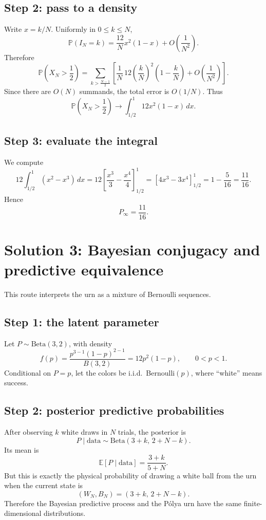 \documentclass[12pt]{article}
\begin{document}
\subsection*{Step 2: pass to a density}
Write $x=k/N$. Uniformly in $0\le k\le N$,
\[
\mathbb{P}(I_N=k)
=
\frac{12}{N}x^2(1-x)+O\!\left(\frac{1}{N^2}\right).
\]
Therefore
\[
\mathbb{P}\!\left(X_N>\frac12\right)
=
\sum_{k>\frac{N-1}{2}}
\left[
\frac{1}{N}\,12\left(\frac{k}{N}\right)^2\left(1-\frac{k}{N}\right)
+O\!\left(\frac{1}{N^2}\right)
\right].
\]
Since there are $O(N)$ summands, the total error is $O(1/N)$. Thus
\[
\mathbb{P}\!\left(X_N>\frac12\right)
\longrightarrow
\int_{1/2}^{1} 12x^2(1-x)\,dx.
\]

\subsection*{Step 3: evaluate the integral}
We compute
\[
12\int_{1/2}^{1}(x^2-x^3)\,dx
=
12\left[\frac{x^3}{3}-\frac{x^4}{4}\right]_{1/2}^{1}
=
\left[4x^3-3x^4\right]_{1/2}^{1}
=
1-\frac{5}{16}
=
\frac{11}{16}.
\]
Hence
\[
P_\infty=\frac{11}{16}.
\]

\section{Solution 3: Bayesian conjugacy and predictive equivalence}

This route interprets the urn as a mixture of Bernoulli sequences.

\subsection*{Step 1: the latent parameter}
Let $P\sim \mathrm{Beta}(3,2)$, with density
\[
f(p)=\frac{p^{3-1}(1-p)^{2-1}}{B(3,2)}=12p^2(1-p), \qquad 0<p<1.
\]
Conditional on $P=p$, let the colors be i.i.d.\ Bernoulli$(p)$, where ``white'' means success.

\subsection*{Step 2: posterior predictive probabilities}
After observing $k$ white draws in $N$ trials, the posterior is
\[
P\mid \text{data}\sim \mathrm{Beta}(3+k,\,2+N-k).
\]
Its mean is
\[
\mathbb{E}[P\mid \text{data}]
=
\frac{3+k}{5+N}.
\]
But this is exactly the physical probability of drawing a white ball from the urn when the current state is
\[
(W_N,B_N)=(3+k,\,2+N-k).
\]
Therefore the Bayesian predictive process and the P\'olya urn have the same finite-dimensional distributions.
\end{document}

